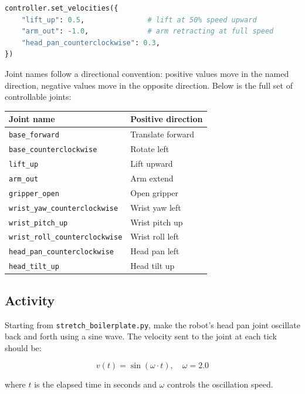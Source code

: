 \documentclass[11pt,a4paper]{article}
\begin{document}
\begin{lstlisting}[language=Python]
controller.set_velocities({
    "lift_up": 0.5,               # lift at 50% speed upward
    "arm_out": -1.0,              # arm retracting at full speed
    "head_pan_counterclockwise": 0.3,
})
\end{lstlisting}

Joint names follow a directional convention: positive values move in the named direction, negative values move in the opposite direction. Below is the full set of controllable joints:

\begin{center}
\begin{tabular}{|l|l|}
\hline
\textbf{Joint name} & \textbf{Positive direction} \\
\hline
\texttt{base\_forward} & Translate forward \\
\texttt{base\_counterclockwise} & Rotate left \\
\texttt{lift\_up} & Lift upward \\
\texttt{arm\_out} & Arm extend \\
\texttt{gripper\_open} & Open gripper \\
\texttt{wrist\_yaw\_counterclockwise} & Wrist yaw left \\
\texttt{wrist\_pitch\_up} & Wrist pitch up \\
\texttt{wrist\_roll\_counterclockwise} & Wrist roll left \\
\texttt{head\_pan\_counterclockwise} & Head pan left \\
\texttt{head\_tilt\_up} & Head tilt up \\
\hline
\end{tabular}
\end{center}

\subsection*{Activity}

Starting from \texttt{stretch\_boilerplate.py}, make the robot's head pan joint oscillate back and forth using a sine wave. The velocity sent to the joint at each tick should be:

\[
v(t) = \sin(\omega \cdot t), \quad \omega = 2.0
\]

where $t$ is the elapsed time in seconds and $\omega$ controls the oscillation speed.
\end{document}
